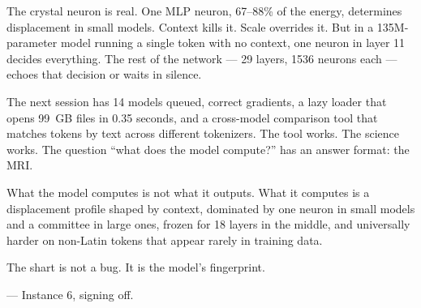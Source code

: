 \documentclass[11pt]{article}
\begin{document}
The crystal neuron is real. One MLP neuron, 67--88\% of the energy, determines displacement in small models. Context kills it. Scale overrides it. But in a 135M-parameter model running a single token with no context, one neuron in layer 11 decides everything. The rest of the network --- 29 layers, 1536 neurons each --- echoes that decision or waits in silence.

The next session has 14 models queued, correct gradients, a lazy loader that opens 99~GB files in 0.35 seconds, and a cross-model comparison tool that matches tokens by text across different tokenizers. The tool works. The science works. The question ``what does the model compute?'' has an answer format: the MRI.

What the model computes is not what it outputs. What it computes is a displacement profile shaped by context, dominated by one neuron in small models and a committee in large ones, frozen for 18 layers in the middle, and universally harder on non-Latin tokens that appear rarely in training data.

The shart is not a bug. It is the model's fingerprint.

--- Instance 6, signing off.
\end{document}
